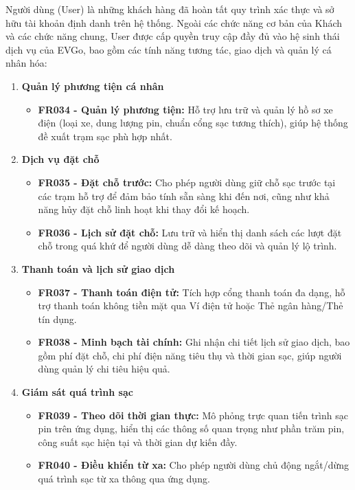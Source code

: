 Người dùng (User) là những khách hàng đã hoàn tất quy trình xác thực và sở hữu tài khoản định danh trên hệ thống. Ngoài các chức năng cơ bản của Khách và các chức năng chung, User được cấp quyền truy cập đầy đủ vào hệ sinh thái dịch vụ của EVGo, bao gồm các tính năng tương tác, giao dịch và quản lý cá nhân hóa:
\begin{enumerate}[label=\textbf{\alph*)}]
    \item \textbf{Quản lý phương tiện cá nhân}
    \begin{itemize}
        \item \textbf{FR034 - Quản lý phương tiện:} Hỗ trợ lưu trữ và quản lý hồ sơ xe điện (loại xe, dung lượng pin, chuẩn cổng sạc tương thích), giúp hệ thống đề xuất trạm sạc phù hợp nhất.
    \end{itemize}
    \item \textbf{Dịch vụ đặt chỗ}
    \begin{itemize}
        \item \textbf{FR035 - Đặt chỗ trước:} Cho phép người dùng giữ chỗ sạc trước tại các trạm hỗ trợ để đảm bảo tính sẵn sàng khi đến nơi, cũng như khả năng hủy đặt chỗ linh hoạt khi thay đổi kế hoạch.
        \item \textbf{FR036 - Lịch sử đặt chỗ:} Lưu trữ và hiển thị danh sách các lượt đặt chỗ trong quá khứ để người dùng dễ dàng theo dõi và quản lý lộ trình.
    \end{itemize}
    \item \textbf{Thanh toán và lịch sử giao dịch}
    \begin{itemize}
        \item \textbf{FR037 - Thanh toán điện tử:} Tích hợp cổng thanh toán đa dạng, hỗ trợ thanh toán không tiền mặt qua Ví điện tử hoặc Thẻ ngân hàng/Thẻ tín dụng.
        \item \textbf{FR038 - Minh bạch tài chính:} Ghi nhận chi tiết lịch sử giao dịch, bao gồm phí đặt chỗ, chi phí điện năng tiêu thụ và thời gian sạc, giúp người dùng quản lý chi tiêu hiệu quả.
    \end{itemize}
    \item \textbf{Giám sát quá trình sạc}
    \begin{itemize}
        \item \textbf{FR039 - Theo dõi thời gian thực:} Mô phỏng trực quan tiến trình sạc pin trên ứng dụng, hiển thị các thông số quan trọng như phần trăm pin, công suất sạc hiện tại và thời gian dự kiến đầy.
        \item \textbf{FR040 - Điều khiển từ xa:} Cho phép người dùng chủ động ngắt/dừng quá trình sạc từ xa thông qua ứng dụng.

\end{itemize}
\end{enumerate}
